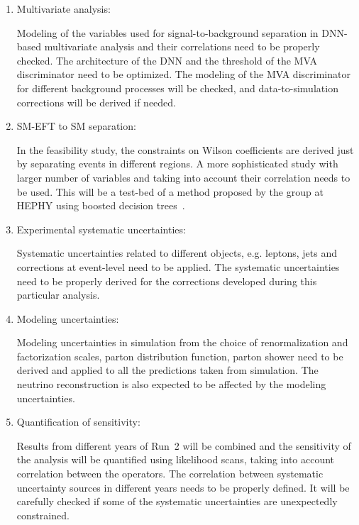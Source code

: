 \documentclass[a4paper,11pt]{article}
\begin{document}
{\begin{enumerate}
In the proposed measurement, the backgrounds are primarily planned to be taken from simulation with a thorough validation by comparing those with data in dedicated control regions. 
Corrections need to be derived wherever needed, and the corresponding systematic uncertainties need to be quantified.   

\item Multivariate analysis: 

Modeling of the variables used for signal-to-background separation in DNN-based multivariate analysis and their correlations need to be properly checked. 
The architecture of the DNN and the threshold of the MVA discriminator need to be optimized. 
The modeling of the MVA discriminator for different background processes will be checked, 
and data-to-simulation corrections will be derived if needed. 

\item SM-EFT to SM separation: 

In the feasibility study, the constraints on Wilson coefficients are derived just by separating events in different regions. A more sophisticated study with larger number of variables and taking into account their correlation needs to be used. 
This will be a test-bed of a method proposed by the group at HEPHY using boosted decision trees~\cite{Chatterjee:2021nms}. 

\item Experimental systematic uncertainties: 

Systematic uncertainties related to different objects, e.g. leptons, jets and corrections at event-level need to be applied. The systematic uncertainties need to be properly derived for the corrections developed during this particular analysis. 

\item Modeling uncertainties: 

Modeling uncertainties in simulation from the choice of renormalization and factorization scales, parton distribution function, parton shower need to be derived and applied to all the predictions taken from simulation. 
The neutrino reconstruction is also expected to be affected by the modeling uncertainties. 

\item Quantification of sensitivity: 

Results from different years of Run~2 will be combined and
the sensitivity of the analysis will be quantified using likelihood scans, taking into account correlation between the operators. 
The correlation between systematic uncertainty sources in different years needs to be properly defined. 
It will be carefully checked if some of the systematic uncertainties are unexpectedly constrained. 


\end{enumerate}}
\end{document}
